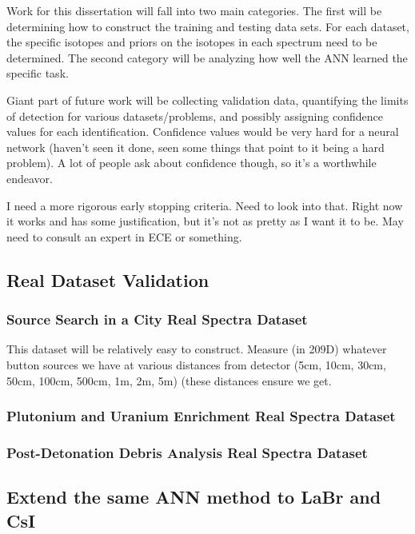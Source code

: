 \documentclass[10pt,letterpaper]{article}
\begin{document}
Work for this dissertation will fall into two main categories. The first will be determining how to construct the training and testing data sets. For each dataset, the specific isotopes and priors on the isotopes in each spectrum need to be determined.  The second category will be analyzing how well the ANN learned the specific task. 

Giant part of future work will be collecting validation data, quantifying the limits of detection for various datasets/problems, and possibly assigning confidence values for each identification. Confidence values would be very hard for a neural network (haven't seen it done, seen some things that point to it being a hard problem). A lot of people ask about confidence though, so it's a worthwhile endeavor.  

I need a more rigorous early stopping criteria. Need to look into that. Right now it works and has some justification, but it's not as pretty as I want it to be. May need to consult an expert in ECE or something.

\subsection{Real Dataset Validation}

\subsubsection{Source Search in a City Real Spectra Dataset}

This dataset will be relatively easy to construct. Measure (in 209D) whatever button sources we have at various distances from detector (5cm, 10cm, 30cm, 50cm, 100cm, 500cm, 1m, 2m, 5m) (these distances ensure we get.

\subsubsection{Plutonium and Uranium Enrichment Real Spectra Dataset}



\subsubsection{Post-Detonation Debris Analysis Real Spectra Dataset}


\subsection{Extend the same ANN method to LaBr and CsI}
   
\end{document}
